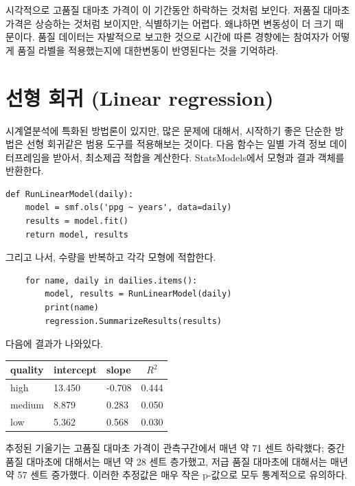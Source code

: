 시각적으로 고품질 대마초 가격이 이 기간동안 하락하는 것처럼 보인다. 저품질 대마초 가격은 상승하는 것처럼 보이지만, 식별하기는 어렵다. 왜냐하면 변동성이 더 크기 때문이다. 품질 데이터는 자발적으로 보고한 것으로 시간에 따른 경향에는 참여자가 어떻게 품질 라벨을 적용했는지에 대한변동이 반영된다는 것을 기억하라.


\section{선형 회귀 (Linear regression)}
\label{timeregress}

시계열분석에 특화된 방법론이 있지만, 많은 문제에 대해서, 시작하기 좋은 단순한 방법은 선형 회귀같은 범용 도구를 적용해보는 것이다.
다음 함수는 일별 가격 정보 데이터프레임을 받아서, 최소제곱 적합을 계산한다. StatsModels에서 모형과 결과 객체를 반환한다.


\begin{verbatim}
def RunLinearModel(daily):
    model = smf.ols('ppg ~ years', data=daily)
    results = model.fit()
    return model, results
\end{verbatim}

그리고 나서, 수량을 반복하고 각각 모형에 적합한다.

\begin{verbatim}
    for name, daily in dailies.items():
        model, results = RunLinearModel(daily)
        print(name)
        regression.SummarizeResults(results)
\end{verbatim}

다음에 결과가 나와있다.

\begin{center}
\begin{tabular}{|l|l|l|c|} \hline
quality & intercept & slope & $R^2$ \\ \hline
high    & 13.450  & -0.708  & 0.444 \\
medium  &  8.879  & 0.283   & 0.050 \\
low     &  5.362  & 0.568   & 0.030 \\
\hline
\end{tabular}
\end{center}

추정된 기울기는 고품질 대마초 가격이 관측구간에서 매년 약 71 센트 하락했다; 중간 품질 대마초에 대해서는 매년 약 28 센트 층가했고, 저급 품질 대마초에 대해서는 매년 약 57 센트 증가했다. 이러한 추정값은 매우 작은 p-값으로 모두 통계적으로 유의하다.

